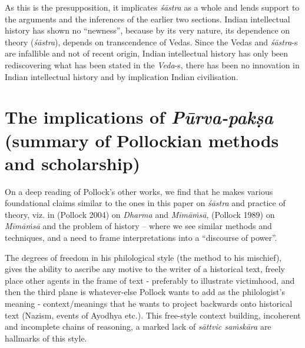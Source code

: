 As this is the presupposition, it implicates {\sl śāstra} as a whole and lends support to the arguments and the inferences of the earlier two sections. Indian intellectual history has shown no ``newness'', because by its very nature, its dependence on theory ({\sl śāstra}), depends on transcendence of Vedas.  Since the Vedas and {\sl śāstra}-s are infallible and not of recent origin, Indian intellectual history has only been rediscovering what has been stated in the {\sl Veda}-s, there has been no innovation in Indian intellectual history and by implication Indian civilisation.

\section*{The implications of {{\sl\bfseries Pūrva-pakṣa}\relax} (summary of Pollockian methods and scholarship)}

On a deep reading of Pollock's other works, we find that he makes various foundational claims similar to the ones in this paper on {\sl śāstra} and practice of theory, viz. in (Pollock 2004) on {\sl Dharma} and {\sl Mīmāṁsā}, (Pollock 1989) on {\sl Mīmāṁsā} and the problem of history -- where we see similar methods and techniques, and a need  to frame interpretations into a ``discourse of power''.

The degrees of freedom in his philological style (the method to his mischief), gives the ability to ascribe any motive to the writer of a historical text, freely place other agents in the frame of text - preferably to illustrate victimhood, and then the third plane is whatever-else Pollock wants to add as the philologist's meaning - context/meanings that he wants to project backwards onto historical text (Nazism, events of Ayodhya etc.). This free-style context building, incoherent and incomplete chains of reasoning, a marked lack of {\sl sāttvic saṁskāra} are hallmarks of this style. 

